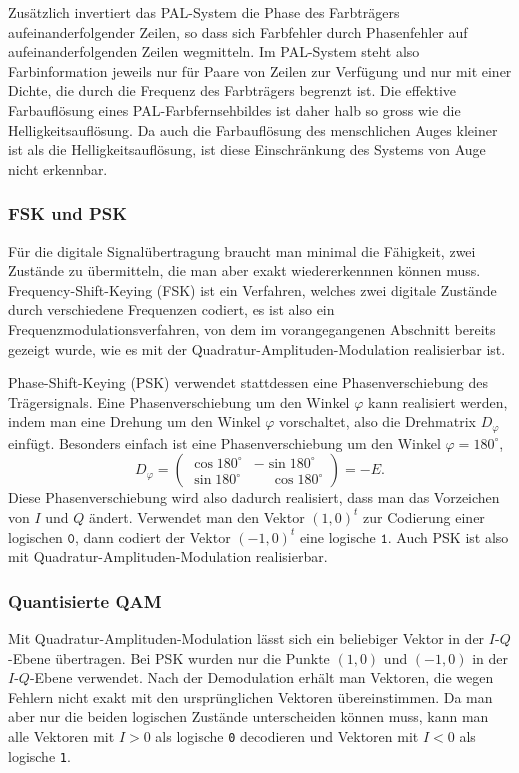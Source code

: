 Zusätzlich invertiert das PAL-System die Phase des Farbträgers
aufeinanderfolgender Zeilen, so dass sich Farbfehler durch Phasenfehler
auf aufeinanderfolgenden Zeilen wegmitteln.
Im PAL-System steht also Farbinformation jeweils nur für Paare von Zeilen
zur Verfügung und nur mit einer Dichte, die durch die Frequenz des Farbträgers
begrenzt ist.
Die effektive Farbauflösung eines PAL-Farbfernsehbildes ist daher halb so
gross wie die Helligkeitsauflösung.
Da auch die Farbauflösung des menschlichen Auges kleiner ist als die
Helligkeitsauflösung, ist diese Einschränkung des Systems von Auge nicht 
erkennbar.

\subsubsection{FSK und PSK}
Für die digitale Signalübertragung braucht man minimal die Fähigkeit,
zwei Zustände zu übermitteln, die man aber exakt wiedererkennnen können muss.
Frequency-Shift-Keying (FSK) ist ein Verfahren, welches zwei digitale Zustände
durch verschiedene Frequenzen codiert, es ist also ein
Frequenzmodulationsverfahren, von dem im vorangegangenen Abschnitt
bereits gezeigt wurde, wie es mit der Quadratur-Amplituden-Modulation
realisierbar ist.

Phase-Shift-Keying (PSK) verwendet stattdessen eine Phasenverschiebung
des Trägersignals.
Eine Phasenverschiebung um den Winkel $\varphi$ kann realisiert werden,
indem man eine Drehung um den Winkel $\varphi$ vorschaltet, also die
Drehmatrix $D_{\varphi}$ einfügt.
Besonders einfach ist eine Phasenverschiebung um den Winkel
$\varphi=180^\circ$, 
\[
D_{\varphi}
=
\begin{pmatrix}
\cos180^\circ&          - \sin180^\circ \\
\sin180^\circ& \phantom{-}\cos180^\circ
\end{pmatrix}
=
-E.
\]
Diese Phasenverschiebung wird also dadurch realisiert, dass man das
Vorzeichen von $I$ und $Q$ ändert.
Verwendet man den Vektor $(1,0)^t$ zur Codierung einer logischen
$\texttt{0}$, dann codiert der Vektor $(-1,0)^t$ eine logische $\texttt{1}$.
Auch PSK ist also mit Quadratur-Amplituden-Modulation realisierbar.

\subsubsection{Quantisierte QAM}
Mit Quadratur-Amplituden-Modulation lässt sich ein beliebiger Vektor
in der $I$-$Q$-Ebene übertragen.
Bei PSK wurden nur die Punkte $(1,0)$  und $(-1,0)$ in der $I$-$Q$-Ebene
verwendet.
Nach der Demodulation erhält man Vektoren, die wegen Fehlern nicht
exakt mit den ursprünglichen Vektoren übereinstimmen.
Da man aber nur die beiden logischen Zustände unterscheiden können muss,
kann man alle Vektoren mit $I>0$ als logische \texttt{0} decodieren
und Vektoren mit $I<0$ als logische \texttt{1}.

